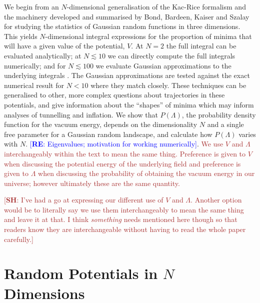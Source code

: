 \documentclass[12pt]{article}
\newcommand{\re}[1]{\textcolor{blue}{[{\bf RE}: #1]}}
\newcommand{\SH}[1]{\textcolor{brown}{[{\bf SH}: #1]}}
\newcommand{\sh}[1]{\textcolor{brown}{#1}}
\begin{document}
 We begin from an $N$-dimensional generalisation of the Kac-Rice formalism \cite{Kac1943,Rice1945} and the  machinery developed and summarised by Bond, Bardeen, Kaiser and Szalay  \cite{BBKS} for studying the statistics of Gaussian random functions in three dimensions. This yields $N$-dimensional integral expressions for the proportion of minima that will have a given value of the potential, $V$. At $N=2$ the full integral can be evaluated analytically; at $N \lesssim 10$ we can directly compute the full integrals numerically; and for $N \lesssim 100$ we evaluate Gaussian approximations to the underlying integrals . The Gaussian approximations are tested against the exact numerical result for $N <10$ where they match closely. These techniques can be generalised to other, more complex questions about trajectories in these potentials, and give information about the ``shapes'' of minima which may inform analyses of tunnelling and inflation. We show that $P(\Lambda)$, the probability density function for the vacuum energy, depends on the dimensionality $N$ and a single free parameter for a Gaussian random landscape, and calculate how $P(\Lambda)$ varies with $N$. \re{Eigenvalues; motivation for working numerically}. \sh{We use $V$ and $\Lambda$ interchangeably within the text to mean the same thing. Preference is given to $V$ when discussing the potential energy of the underlying field and preference is given to $\Lambda$ when discussing the probability of obtaining the vacuum energy in our universe; however ultimately these are the same quantity.}

 \SH{I've had a go at expressing our different use of $V$ and $\Lambda$. Another option would be to literally say we use them interchangeably to mean the same thing and leave it at that. I think \emph{something} needs mentioned here though so that readers know they are interchangeable without having to read the whole paper carefully.}

\section{Random Potentials in $N$ Dimensions}

\end{document}
